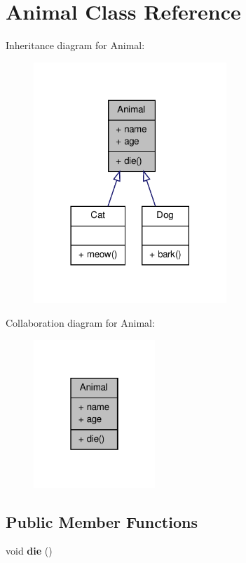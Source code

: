 \hypertarget{class_animal}{\section{Animal Class Reference}
\label{class_animal}
}


Inheritance diagram for Animal\-:
\nopagebreak
\begin{figure}[H]
\begin{center}
\leavevmode
\includegraphics[width=206pt]{class_animal__inherit__graph}
\end{center}
\end{figure}


Collaboration diagram for Animal\-:
\nopagebreak
\begin{figure}[H]
\begin{center}
\leavevmode
\includegraphics[width=130pt]{class_animal__coll__graph}
\end{center}
\end{figure}
\subsection*{Public Member Functions}
\begin{DoxyCompactItemize}
\item 
\hypertarget{class_animal_a557fe0d71dda75be2f8459ce0d7c2275}{void {\bfseries die} ()}\label{class_animal_a557fe0d71dda75be2f8459ce0d7c2275}

\end{DoxyCompactItemize}
